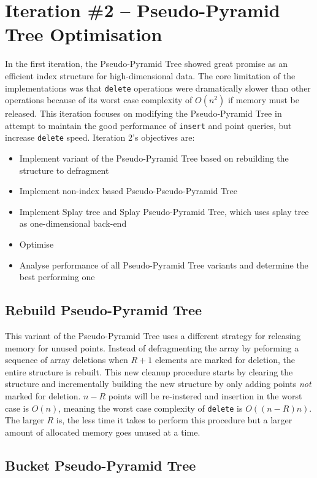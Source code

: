 \section{Iteration \#2 -- Pseudo-Pyramid Tree Optimisation}

In the first iteration, the Pseudo-Pyramid Tree showed great promise as an efficient index structure for high-dimensional data. The core limitation of the implementations was that \texttt{delete} operations were dramatically slower than other operations because of its worst case complexity of $O(n^2)$ if memory must be released. This iteration focuses on modifying the Pseudo-Pyramid Tree in attempt to maintain the good performance of \texttt{insert} and point queries, but increase \texttt{delete} speed. Iteration 2's objectives are:
\begin{itemize}
	\item Implement variant of the Pseudo-Pyramid Tree based on rebuilding the structure to defragment
	\item Implement non-index based Pseudo-Pseudo-Pyramid Tree
	\item Implement Splay tree and Splay Pseudo-Pyramid Tree, which uses splay tree as one-dimensional back-end
	\item Optimise 
	\item Analyse performance of all Pseudo-Pyramid Tree variants and determine the best performing one
\end{itemize}

\subsection{Rebuild Pseudo-Pyramid Tree}

This variant of the Pseudo-Pyramid Tree uses a different strategy for releasing memory for unused points. Instead of defragmenting the array by peforming a sequence of array deletions when $R + 1$ elements are marked for deletion, the entire structure is rebuilt. This new cleanup procedure starts by clearing the structure and incrementally building the new structure by only adding points \textit{not} marked for deletion. $n - R$ points will be re-instered and insertion in the worst case is $O(n)$, meaning the worst case complexity of \texttt{delete} is $O((n - R)n)$. The larger $R$ is, the less time it takes to perform this procedure but a larger amount of allocated memory goes unused at a time.

\subsection{Bucket Pseudo-Pyramid Tree}

